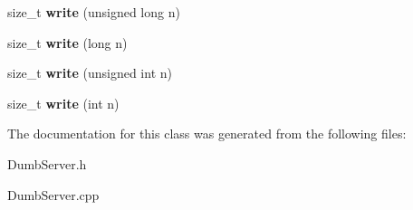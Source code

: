 \begin{DoxyCompactItemize}
size\+\_\+t {\bfseries write} (unsigned long n)
\item 
\mbox{\label{class_esp_server_a3cfec102ee6f58a2f7e617999ce9f5bb}} 
size\+\_\+t {\bfseries write} (long n)
\item 
\mbox{\label{class_esp_server_a2d9bc6ac05e45a7023be3cd1ca224407}} 
size\+\_\+t {\bfseries write} (unsigned int n)
\item 
\mbox{\label{class_esp_server_a22e7ab55e0aa268cff5b48e763429ec3}} 
size\+\_\+t {\bfseries write} (int n)
\end{DoxyCompactItemize}


The documentation for this class was generated from the following files\+:\begin{DoxyCompactItemize}
\item 
Dumb\+Server.\+h\item 
Dumb\+Server.\+cpp\end{DoxyCompactItemize}
